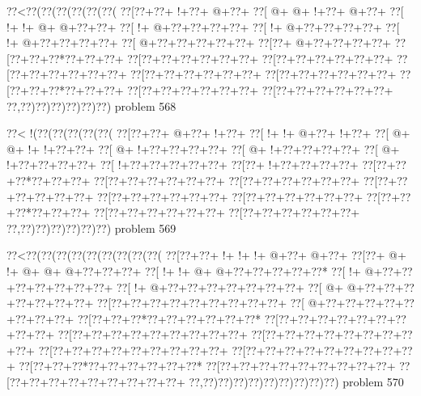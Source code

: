 \vbox{\vbox{\goo
\0??<\0??(\0??(\0??(\0??(\0??(\0??(
\0??[\0??+\0??+\- !+\0??+\- @+\0??+
\0??[\- @+\- @+\- !+\0??+\- @+\0??+
\0??[\- !+\- !+\- @+\- @+\0??+\0??+
\0??[\- !+\- @+\0??+\0??+\0??+\0??+
\0??[\- !+\- @+\0??+\0??+\0??+\0??+
\0??[\- !+\- @+\0??+\0??+\0??+\0??+
\0??[\- @+\0??+\0??+\0??+\0??+\0??+
\0??[\0??+\- @+\0??+\0??+\0??+\0??+
\0??[\0??+\0??+\0??*\0??+\0??+\0??+
\0??[\0??+\0??+\0??+\0??+\0??+\0??+
\0??[\0??+\0??+\0??+\0??+\0??+\0??+
\0??[\0??+\0??+\0??+\0??+\0??+\0??+
\0??[\0??+\0??+\0??+\0??+\0??+\0??+
\0??[\0??+\0??+\0??+\0??+\0??+\0??+
\0??[\0??+\0??+\0??*\0??+\0??+\0??+
\0??[\0??+\0??+\0??+\0??+\0??+\0??+
\0??[\0??+\0??+\0??+\0??+\0??+\0??+
\0??,\0??)\0??)\0??)\0??)\0??)\0??)
}
\hfil problem 568\hfil\break
}

\vbox{\vbox{\goo
\0??<\- !(\0??(\0??(\0??(\0??(\0??(
\0??[\0??+\0??+\- @+\0??+\- !+\0??+
\0??[\- !+\- !+\- @+\0??+\- !+\0??+
\0??[\- @+\- @+\- !+\- !+\0??+\0??+
\0??[\- @+\- !+\0??+\0??+\0??+\0??+
\0??[\- @+\- !+\0??+\0??+\0??+\0??+
\0??[\- @+\- !+\0??+\0??+\0??+\0??+
\0??[\- !+\0??+\0??+\0??+\0??+\0??+
\0??[\0??+\- !+\0??+\0??+\0??+\0??+
\0??[\0??+\0??+\0??*\0??+\0??+\0??+
\0??[\0??+\0??+\0??+\0??+\0??+\0??+
\0??[\0??+\0??+\0??+\0??+\0??+\0??+
\0??[\0??+\0??+\0??+\0??+\0??+\0??+
\0??[\0??+\0??+\0??+\0??+\0??+\0??+
\0??[\0??+\0??+\0??+\0??+\0??+\0??+
\0??[\0??+\0??+\0??*\0??+\0??+\0??+
\0??[\0??+\0??+\0??+\0??+\0??+\0??+
\0??[\0??+\0??+\0??+\0??+\0??+\0??+
\0??,\0??)\0??)\0??)\0??)\0??)\0??)
}
\hfil problem 569\hfil\break
}

\vbox{\vbox{\goo
\0??<\0??(\0??(\0??(\0??(\0??(\0??(\0??(\0??(\0??(
\0??[\0??+\0??+\- !+\- !+\- !+\- @+\0??+\- @+\0??+
\0??[\0??+\- @+\- !+\- @+\- @+\- @+\0??+\0??+\0??+
\0??[\- !+\- !+\- @+\- @+\0??+\0??+\0??+\0??+\0??*
\0??[\- !+\- @+\0??+\0??+\0??+\0??+\0??+\0??+\0??+
\0??[\- !+\- @+\0??+\0??+\0??+\0??+\0??+\0??+\0??+
\0??[\- @+\- @+\0??+\0??+\0??+\0??+\0??+\0??+\0??+
\0??[\0??+\0??+\0??+\0??+\0??+\0??+\0??+\0??+\0??+
\0??[\- @+\0??+\0??+\0??+\0??+\0??+\0??+\0??+\0??+
\0??[\0??+\0??+\0??*\0??+\0??+\0??+\0??+\0??+\0??*
\0??[\0??+\0??+\0??+\0??+\0??+\0??+\0??+\0??+\0??+
\0??[\0??+\0??+\0??+\0??+\0??+\0??+\0??+\0??+\0??+
\0??[\0??+\0??+\0??+\0??+\0??+\0??+\0??+\0??+\0??+
\0??[\0??+\0??+\0??+\0??+\0??+\0??+\0??+\0??+\0??+
\0??[\0??+\0??+\0??+\0??+\0??+\0??+\0??+\0??+\0??+
\0??[\0??+\0??+\0??*\0??+\0??+\0??+\0??+\0??+\0??*
\0??[\0??+\0??+\0??+\0??+\0??+\0??+\0??+\0??+\0??+
\0??[\0??+\0??+\0??+\0??+\0??+\0??+\0??+\0??+\0??+
\0??,\0??)\0??)\0??)\0??)\0??)\0??)\0??)\0??)\0??)
}
\hfil problem 570\hfil\break
}

